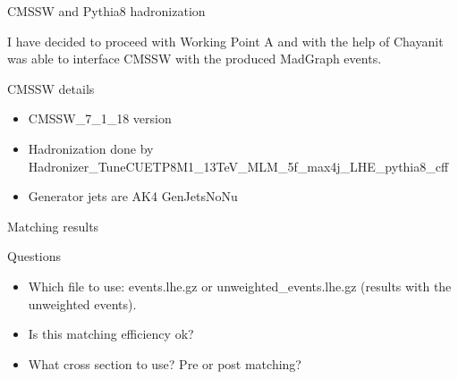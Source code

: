 \documentclass[8pt]{beamer}
\begin{document}
\begin{frame}{CMSSW and Pythia8 hadronization}
  
I have decided to proceed with Working Point A and with the help of Chayanit was able to interface CMSSW with the produced MadGraph events. 

\begin{block}{CMSSW details}
  
\begin{itemize}
  \item CMSSW\_7\_1\_18 version
  \item Hadronization done by Hadronizer\_TuneCUETP8M1\_13TeV\_MLM\_5f\_max4j\_LHE\_pythia8\_cff
  \item Generator jets are AK4 GenJetsNoNu
\end{itemize}

\end{block}

\begin{block}{Matching results}


\end{block}

\begin{block}{Questions}

\begin{itemize}
  \item Which file to use: events.lhe.gz or unweighted\_events.lhe.gz (results with the unweighted events).
  \item Is this matching efficiency ok? 
  \item What cross section to use? Pre or post matching?
\end{itemize}

\end{block}

\end{frame}
\end{document}
